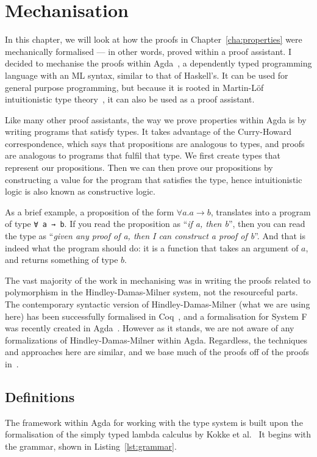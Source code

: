 \chapter{Mechanisation}\label{cha:mechanisation}
In this chapter, we will look at how the proofs in
Chapter~\ref{cha:properties} were mechanically formalised --- in other
words, proved within a proof assistant.  I decided to mechanise the
proofs within Agda~\cite{norell2009}, a dependently typed programming
language with an ML syntax, similar to that of Haskell's. It can be
used for general purpose programming, but because it is rooted in
Martin-Löf intuitionistic type theory~\cite{martin-lof1984}, it can
also be used as a proof assistant.

Like many other proof assistants, the way we prove properties within
Agda is by writing programs that satisfy types. It takes advantage of
the Curry-Howard correspondence, which says that propositions are
analogous to types, and proofs are analogous to programs that fulfil
that type. We first create types that represent our
propositions. Then we can then prove our propositions by constructing
a value for the program that satisfies the type, hence intuitionistic
logic is also known as constructive logic.

As a brief example, a proposition of the form
$\forall a. a \rightarrow b$, translates into a program of type \texttt{∀ a → b}. If you read the proposition as ``\textit{if a, then b}'', then
you can read the type as ``\textit{given any proof of a, then I can
  construct a proof of b}''. And that is indeed what the program
should do: it is a function that takes an argument of $a$, and returns
something of type $b$.

The vast majority of the work in mechanising was in writing the proofs
related to polymorphism in the Hindley-Damas-Milner system, not the
resourceful parts. The contemporary syntactic version of
Hindley-Damas-Milner (what we are using here) has been successfully
formalised in Coq~\cite{dubois2000}, and a formalisation for System F
was recently created in Agda~\cite{chapman2019}. However as it stands,
we are not aware of any formalizations of Hindley-Damas-Milner within
Agda. Regardless, the techniques and approaches here are similar, and
we base much of the proofs off of the proofs in~\cite{wright1994}.

\section{Definitions}
The framework within Agda for working with the type system is built
upon the formalisation of the simply typed lambda calculus by Kokke et
al.~\cite{kokke2020} It begins with the grammar, shown in
Listing~\ref{lst:grammar}.

